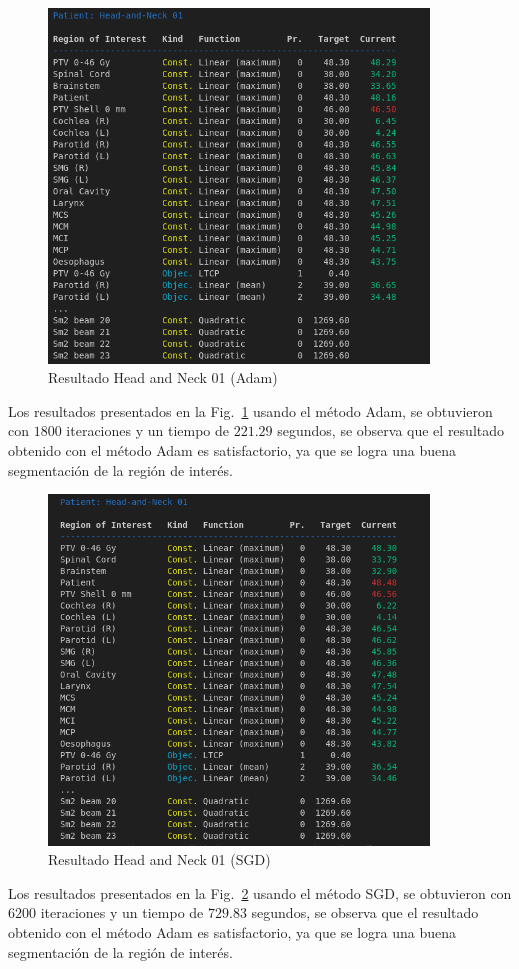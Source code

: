 \documentclass[a4paper,12pt]{article}
\begin{document}
  \begin{figure}[!ht]
    \centering
    \includegraphics[width=0.9\textwidth]{result_adam01.png}
    \caption{Resultado Head and Neck 01 (Adam)}
    \label{fig:result_adam}
  \end{figure}
Los resultados presentados en la Fig.~\ref{fig:result_adam} usando el método Adam, se obtuvieron con $1800$ iteraciones y un tiempo de $221.29$ segundos, se observa que el resultado obtenido con el método Adam es satisfactorio, ya que se logra una buena segmentación de la región de interés.

\begin{figure}[!ht]
    \centering
    \includegraphics[width=0.9\textwidth]{result_sgd01.png}
    \caption{Resultado Head and Neck 01 (SGD)}
    \label{fig:result_sgd}
  \end{figure}
\newpage
Los resultados presentados en la Fig.~\ref{fig:result_sgd} usando el método SGD, se obtuvieron con $6200$ iteraciones y un tiempo de $729.83$ segundos, se observa que el resultado obtenido con el método Adam es satisfactorio, ya que se logra una buena segmentación de la región de interés.
\end{document}
